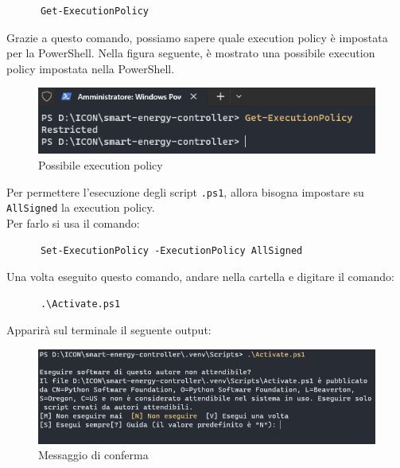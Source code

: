 \documentclass[12pt, letterpaper]{article}
\begin{document}
\begin{verbatim}
      Get-ExecutionPolicy
\end{verbatim}

\noindent Grazie a questo comando, possiamo sapere quale execution policy è impostata per la PowerShell.
Nella figura seguente, è mostrato una possibile execution policy impostata nella PowerShell. \\

\begin{figure}[h]
      \centering
      \includegraphics{powershell-error.png}
      \caption{Possibile execution policy}
\end{figure}

\noindent Per permettere l'esecuzione degli script \texttt{.ps1}, allora bisogna impostare
su \texttt{AllSigned} la execution policy. \\
\noindent Per farlo si usa il comando: \\

\begin{verbatim}
      Set-ExecutionPolicy -ExecutionPolicy AllSigned
\end{verbatim}

Una volta eseguito questo comando, andare nella cartella  e digitare il
comando:

\begin{verbatim}
      .\Activate.ps1
\end{verbatim}

Apparirà sul terminale il seguente output: \\

\begin{figure}[h]
      \centering
      \includegraphics[scale=0.6]{terminal-message.png}
      \caption{Messaggio di conferma}
\end{figure}
\end{document}

